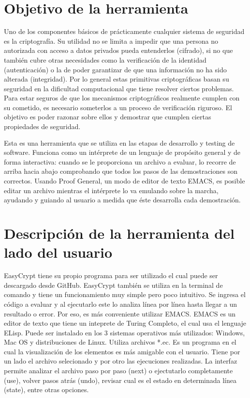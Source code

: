 \documentclass[runningheads,a4paper]{llncs}
\begin{document}
\section{Objetivo de la herramienta} 
Uno de los componentes básicos de prácticamente cualquier sistema de seguridad es la criptografía. Su utilidad no se limita a impedir que una persona no autorizada con acceso a datos privados pueda entenderlos (cifrado), si no que también cubre otras necesidades como la verificación de la identidad (autenticación) o la de poder garantizar de que una información no ha sido alterada (integridad). Por lo general estas primitivas criptográficas basan su seguridad en la dificultad computacional que tiene resolver ciertos problemas. Para estar seguros de que los mecanismos criptográficos realmente cumplen con su cometido, es necesario someterlos a un proceso de verificación riguroso. El objetivo es poder razonar sobre ellos y demostrar que cumplen ciertas propiedades de seguridad. 

Esta es una herramienta que se utiliza en las etapas de desarrollo y testing de software. Funciona como un intérprete de un lenguaje de propósito general y de forma interactiva: cuando se le proporciona un archivo a evaluar, lo recorre de arriba hacia abajo comprobando que todos los pasos de las demostraciones son correctos. Usando Proof General, un modo de editor de texto EMACS, es posible editar un archivo mientras el intérprete lo va emulando sobre la marcha, ayudando y guiando al usuario a medida que éste desarrolla cada demostración. 

\section{Descripción de la herramienta del lado del usuario}

EasyCrypt tiene su propio programa para ser utilizado el cual puede ser descargado desde GitHub.\cite{link1}
EasyCrypt también se utiliza en la terminal de comando y tiene un funcionamiento muy simple pero poco intuitivo. Se ingresa el código a evaluar y al ejecutarlo este lo analiza línea por línea hasta llegar a un resultado o error. Por eso, es más conveniente utilizar EMACS\cite{link2}. EMACS es un editor de texto que tiene un inteprete de Turing Completo, el cual usa el lenguaje ELisp. Puede ser instalado en los 3 sistemas operativos más utilizados: Windows, Mac OS y distribuciones de Linux. Utiliza archivos *.ec. Es un programa en el cual la visualización de los elementos es más amigable con el usuario. Tiene por un lado el archivo selecionado y por otro las ejecuciones realizadas. La interfaz permite analizar el archivo paso por paso (next) o ejectutarlo completamente (use), volver pasos atrás (undo), revisar cual es el estado en determinada línea (state), entre otras opciones.
\end{document}
